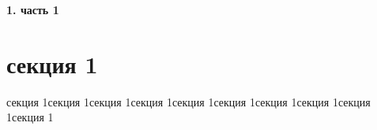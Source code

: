 \newpage
\begin{center}
  \textbf{\large 1. часть 1}
\end{center}


\section{секция 1}

секция 1секция 1секция 1секция 1секция 1секция 1секция 1секция 1секция 1секция 1
